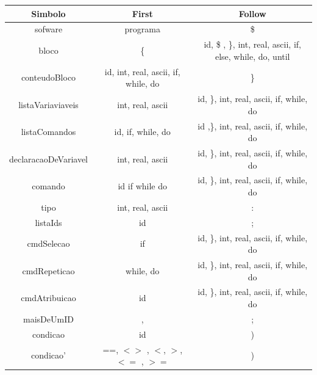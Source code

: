 \documentclass[11pt]{article}
\begin{document}
\begin{table}[H]
    \hspace{-3cm}
    \begin{tabular}{c|c|c}
        \hline
        \textbf{Simbolo}     & \textbf{First}                      & \textbf{Follow}  \\
        \hline
        sofware              & programa                            & \$                \\
        \hline
         bloco               & \{                                  & id, \$ , \}, int, real, ascii, if, else, while, do, until\\
        \hline
        conteudoBloco        & id, int, real, ascii, if, while, do & \}        \\
        \hline
        listaVariaviaveis    & int, real, ascii                    & id, \}, int, real, ascii, if, while, do \\
        \hline
        listaComandos        & id, if, while, do                   & id ,\}, int, real, ascii, if, while, do \\
        \hline
        declaracaoDeVariavel & int, real, ascii                    & id, \}, int, real, ascii, if, while, do \\
        \hline
        comando              & id if while do                      & id, \}, int, real, ascii, if, while, do \\
        \hline
        tipo                 & int, real, ascii                    & : \\
        \hline
        listaIds             & id                                  & ; \\
        \hline
        cmdSelecao           & if                                  & id, \}, int, real, ascii, if, while, do\\
        \hline
        cmdRepeticao         & while, do                           & id, \}, int, real, ascii, if, while, do \\
        \hline
        cmdAtribuicao        & id                                  & id, \}, int, real, ascii, if, while, do \\
        \hline
        maisDeUmID           & ,                                   & ; \\
        \hline
        condicao             & id                                  & ) \\
        \hline
        condicao'            & ==, $<>$ , $<$, $>$, $<=$ , $>=$    & ) \\

\end{tabular}
\end{table}
\end{document}
